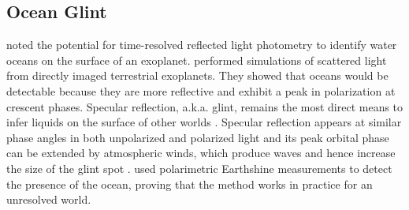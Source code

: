 \documentclass[
    usenatbib,
]{mnras}
\begin{document}
\subsection{Ocean Glint}
\cite{2001Natur.412..885F} noted the potential for time-resolved reflected light photometry to identify water oceans on the surface of an exoplanet.  \cite{2008Icar..195..927W} performed simulations of scattered light from directly imaged terrestrial exoplanets. 
They showed that oceans would be detectable because they are more reflective and exhibit a peak in polarization at crescent phases. %
Specular reflection, a.k.a. glint, remains the most direct means to infer liquids on the surface of other worlds \citep[e.g., Titan's methane lakes;][]{2010GeoRL..37.7104S}. %
Specular reflection appears at similar phase angles in both unpolarized and polarized light and its peak orbital phase can be extended by atmospheric winds, which produce waves and hence increase the size of the glint spot \citep{2011Icar..211..722B,kopparla2018}.
\citet{Takahashi2021} used polarimetric Earthshine measurements to detect the presence of the ocean, proving that the method works in practice for an unresolved world.



\end{document}
